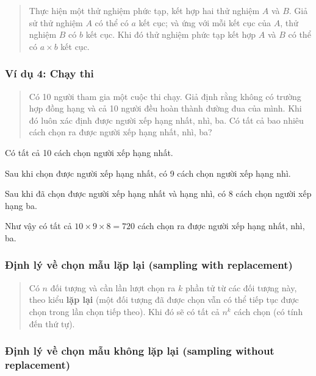 \documentclass[
]{book}
\begin{document}
\begin{quote}
Thực hiện một thử nghiệm phức tạp, kết hợp hai thử nghiệm \(A\) và \(B\). Giả sử thử nghiệm \(A\) có thể có \(a\) kết cục; và ứng với mỗi kết cục của \(A\), thử nghiệm \(B\) có \(b\) kết cục. Khi đó thử nghiệm phức tạp kết hợp \(A\) và \(B\) có thể có \(a \times b\) kết cục.
\end{quote}

\hypertarget{vuxed-dux1ee5-4-chux1ea1y-thi}{%
\subsubsection{Ví dụ 4: Chạy thi}\label{vuxed-dux1ee5-4-chux1ea1y-thi}}

\begin{quote}
Có 10 người tham gia một cuộc thi chạy. Giả định rằng không có trường hợp đồng hạng và cả 10 người đều hoàn thành đường đua của mình. Khi đó luôn xác định được người xếp hạng nhất, nhì, ba. Có tất cả bao nhiêu cách chọn ra được người xếp hạng nhất, nhì, ba?
\end{quote}

Có tất cả 10 cách chọn người xếp hạng nhất.

Sau khi chọn được người xếp hạng nhất, có 9 cách chọn người xếp hạng nhì.

Sau khi đã chọn được người xếp hạng nhất và hạng nhì, có 8 cách chọn người xếp hạng ba.

Như vậy có tất cả \(10 \times 9 \times 8 = 720\) cách chọn ra được người xếp hạng nhất, nhì, ba.

\hypertarget{ux111ux1ecbnh-luxfd-vux1ec1-chux1ecdn-mux1eabu-lux1eb7p-lux1ea1i-sampling-with-replacement}{%
\subsubsection{Định lý về chọn mẫu lặp lại (sampling with replacement)}\label{ux111ux1ecbnh-luxfd-vux1ec1-chux1ecdn-mux1eabu-lux1eb7p-lux1ea1i-sampling-with-replacement}}

\begin{quote}
Có \(n\) đối tượng và cần lần lượt chọn ra \(k\) phần tử từ các đối tượng này, theo kiểu \textbf{lặp lại} (một đối tượng đã được chọn vẫn có thể tiếp tục được chọn trong lần chọn tiếp theo). Khi đó sẽ có tất cả \(n^k\) cách chọn (có tính đến thứ tự).
\end{quote}

\hypertarget{ux111ux1ecbnh-luxfd-vux1ec1-chux1ecdn-mux1eabu-khuxf4ng-lux1eb7p-lux1ea1i-sampling-without-replacement}{%
\subsubsection{Định lý về chọn mẫu không lặp lại (sampling without replacement)}\label{ux111ux1ecbnh-luxfd-vux1ec1-chux1ecdn-mux1eabu-khuxf4ng-lux1eb7p-lux1ea1i-sampling-without-replacement}}
\end{document}
